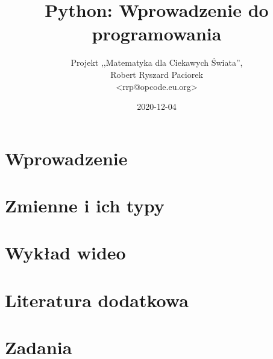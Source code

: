 \documentclass{pdfBooklets}
\title{Python: Wprowadzenie do programowania}
\author{%
	Projekt ,,Matematyka dla Ciekawych Świata'',\\
	Robert Ryszard Paciorek\\\normalsize\ttfamily <rrp@opcode.eu.org>
}
\date  {2020-12-04}
\begin{document}
\maketitle

\section{Wprowadzenie}


\student{\clearpage}

\student{\clearpage}


\student{\clearpage}
\section{Zmienne i ich typy}















\section{Wykład wideo}



\section{Literatura dodatkowa }


\student{\clearpage}
\section{Zadania}




\end{document}
